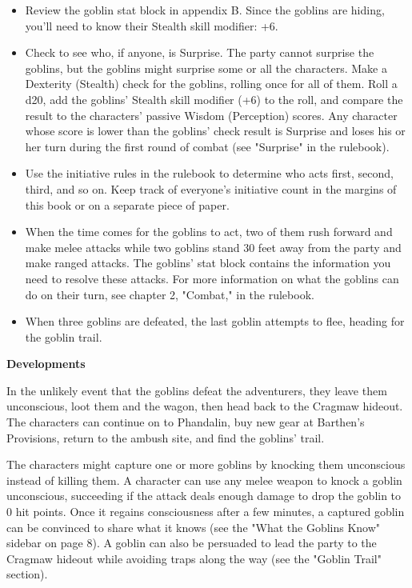 \documentclass[10pt,a4paper,twoside,bg=print,twocolumn,openany,nodeprecatedcode]{dndbook}
\begin{document}
\begin{itemize}
\item Review the goblin stat block in appendix B. Since the goblins are hiding, you'll need to know their Stealth skill modifier: +6.
\item Check to see who, if anyone, is Surprise. The party cannot surprise the goblins, but the goblins might surprise some or all the characters. Make a Dexterity (Stealth) check for the goblins, rolling once for all of them. Roll a d20, add the goblins' Stealth skill modifier (+6) to the roll, and compare the result to the characters' passive Wisdom (Perception) scores. Any character whose score is lower than the goblins' check result is Surprise and loses his or her turn during the first round of combat (see "Surprise" in the rulebook).
\item Use the initiative rules in the rulebook to determine who acts first, second, third, and so on. Keep track of everyone's initiative count in the margins of this book or on a separate piece of paper.
\item When the time comes for the goblins to act, two of them rush forward and make melee attacks while two goblins stand 30 feet away from the party and make ranged attacks. The goblins' stat block contains the information you need to resolve these attacks. For more information on what the goblins can do on their turn, see chapter 2, "Combat," in the rulebook.
\item When three goblins are defeated, the last goblin attempts to flee, heading for the goblin trail.
\end{itemize}

\textbf{Developments}

In the unlikely event that the goblins defeat the adventurers, they leave them unconscious, loot them and the wagon, then head back to the Cragmaw hideout. The characters can continue on to Phandalin, buy new gear at Barthen's Provisions, return to the ambush site, and find the goblins' trail.

The characters might capture one or more goblins by knocking them unconscious instead of killing them. A character can use any melee weapon to knock a goblin unconscious, succeeding if the attack deals enough damage to drop the goblin to 0 hit points. Once it regains consciousness after a few minutes, a captured goblin can be convinced to share what it knows (see the "What the Goblins Know" sidebar on page 8). A goblin can also be persuaded to lead the party to the Cragmaw hideout while avoiding traps along the way (see the "Goblin Trail" section).
\end{document}
